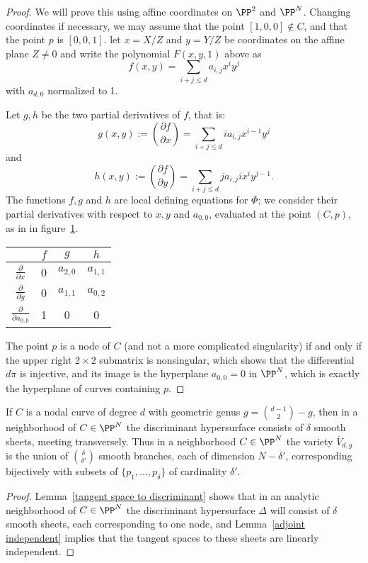 \begin{proof}
We will prove this using affine coordinates on $\PP^2$ and $\PP^N$. Changing coordinates if necessary, we may assume that the point $[1,0,0] \notin C$, and that the point $p$ is $[0,0,1]$. let $x = X/Z$ and $y = Y/Z$ be coordinates on the affine plane $Z \neq 0$ and write the polynomial $F(x,y,1)$ above as
$$
f(x,y) = \sum_{i+j \leq d} a_{i,j} x^iy^j
$$
with $a_{d,0}$ normalized to 1. 

Let $g,h$ be the two partial derivatives of $f$, that is:
$$
g(x,y) := \binom{\partial f}{\partial x} = \sum_{i+j \leq d} i a_{i,j} x^{i-1}y^j
$$
and
$$
h(x,y) := \binom{\partial f}{\partial y} = \sum_{i+j \leq d} j a_{i,j} ix^{i}y^{j-1}.
$$
The functions $f, g$ and $h$ are local defining equations for $\Phi$; we consider their partial derivatives with respect to $x, y$ and $a_{0,0}$, evaluated at the point $(C,p)$, as in in figure~\ref{tang to Delta}.

\begin{table}[h!]\label{tang to Delta}
  \begin{center}
     \begin{tabular}{c|c|c|c} %
            & $f$ & $g$ & $h$ \\
      \hline
$\frac{\partial}{\partial x}$ & 0 & $a_{2,0}$ & $a_{1,1}$ \\
$\frac{\partial}{\partial y}$ & 0 & $a_{1,1}$ & $a_{0,2}$ \\
$\frac{\partial}{\partial a_{0,0}}$ & 1 & 0 & 0 
    \end{tabular}
  \end{center}
\end{table}

The point $p$ is a node of $C$ (and not a more complicated singularity) if and only if the upper right $2 \times 2$ submatrix is nonsingular, which shows that the differential $d\pi$ is injective, and its image is the hyperplane $a_{0,0} = 0$ in $\PP^N$, which is exactly the hyperplane of curves containing $p$.
\end{proof}

\begin{corollary}\label{local geometry of Severi}
If $C$ is a nodal curve of degree $d$ with geometric genus $g = \binom{d-1}{2}-g$, then in a neighborhood of $C\in \PP^N$
the discriminant hypersurface consists of $\delta$ smooth sheets, meeting transversely. Thus in a neighborhood  $C \in \PP^N$ 
the variety $\overline V_{d,g}$ is the union of $\binom{\delta}{\delta'}$ smooth branches, each of dimension $N - \delta'$, corresponding bijectively with subsets of $\{p_1,\dots,p_\delta\}$ of cardinality $\delta'$.
\end{corollary}
\begin{proof}
Lemma~\ref{tangent space to discriminant} shows that in an analytic neighborhood of $C\in \PP^N$ the discriminant hypersurface $\Delta$ will consist of $\delta$ smooth sheets, each corresponding to one node, and Lemma~\ref{adjoint independent} implies that the tangent spaces to these sheets are linearly independent. 
\end{proof}


